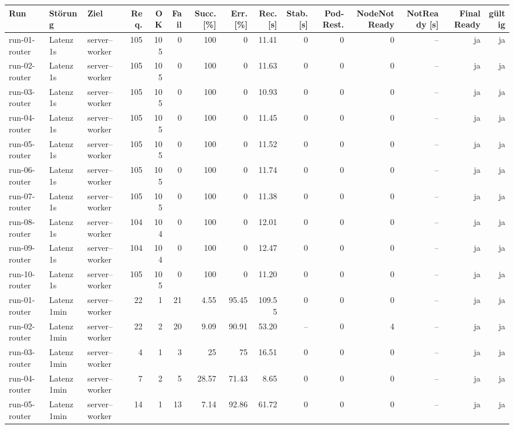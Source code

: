 \begin{table}
\centering
\scriptsize
\setlength{\tabcolsep}{3pt}
\renewcommand{\arraystretch}{1.08}
\begin{tabular}{l l p{3.2cm} r r r r r r r r r r r r}
\toprule
Run & Störung & Ziel & Req. & OK & Fail & Succ. [\%] & Err. [\%] & Rec. [s] & Stab. [s] & Pod-Rest. & NodeNotReady & NotReady [s] & Final Ready & gültig \\
\midrule
run-01-router & Latenz 1s & server--worker & 105 & 105 & 0 & 100 & 0 & 11.41 & 0 & 0 & 0 & -- & ja & ja \\
run-02-router & Latenz 1s & server--worker & 105 & 105 & 0 & 100 & 0 & 11.63 & 0 & 0 & 0 & -- & ja & ja \\
run-03-router & Latenz 1s & server--worker & 105 & 105 & 0 & 100 & 0 & 10.93 & 0 & 0 & 0 & -- & ja & ja \\
run-04-router & Latenz 1s & server--worker & 105 & 105 & 0 & 100 & 0 & 11.45 & 0 & 0 & 0 & -- & ja & ja \\
run-05-router & Latenz 1s & server--worker & 105 & 105 & 0 & 100 & 0 & 11.52 & 0 & 0 & 0 & -- & ja & ja \\
run-06-router & Latenz 1s & server--worker & 105 & 105 & 0 & 100 & 0 & 11.74 & 0 & 0 & 0 & -- & ja & ja \\
run-07-router & Latenz 1s & server--worker & 105 & 105 & 0 & 100 & 0 & 11.38 & 0 & 0 & 0 & -- & ja & ja \\
run-08-router & Latenz 1s & server--worker & 104 & 104 & 0 & 100 & 0 & 12.01 & 0 & 0 & 0 & -- & ja & ja \\
run-09-router & Latenz 1s & server--worker & 104 & 104 & 0 & 100 & 0 & 12.47 & 0 & 0 & 0 & -- & ja & ja \\
run-10-router & Latenz 1s & server--worker & 105 & 105 & 0 & 100 & 0 & 11.20 & 0 & 0 & 0 & -- & ja & ja \\
run-01-router & Latenz 1min & server--worker & 22 & 1 & 21 & 4.55 & 95.45 & 109.55 & 0 & 0 & 0 & -- & ja & ja \\
run-02-router & Latenz 1min & server--worker & 22 & 2 & 20 & 9.09 & 90.91 & 53.20 & -- & 0 & 4 & -- & ja & ja \\
run-03-router & Latenz 1min & server--worker & 4 & 1 & 3 & 25 & 75 & 16.51 & 0 & 0 & 0 & -- & ja & ja \\
run-04-router & Latenz 1min & server--worker & 7 & 2 & 5 & 28.57 & 71.43 & 8.65 & 0 & 0 & 0 & -- & ja & ja \\
run-05-router & Latenz 1min & server--worker & 14 & 1 & 13 & 7.14 & 92.86 & 61.72 & 0 & 0 & 0 & -- & ja & ja \\

\end{tabular}
\end{table}
